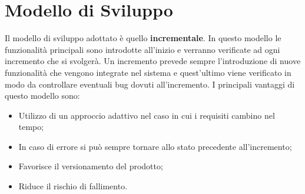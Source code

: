 \section{Modello di Sviluppo}
Il modello di sviluppo adottato è quello \textbf{incrementale}. In questo
modello le funzionalità principali sono introdotte all'inizio e verranno verificate 
ad ogni incremento che si svolgerà. Un incremento prevede sempre l'introduzione di nuove
funzionalità che vengono integrate nel sistema e quest'ultimo viene verificato in modo da
controllare eventuali bug dovuti all'incremento. I principali vantaggi di questo modello sono:
\begin{itemize}
    \item Utilizzo di un approccio adattivo nel caso in cui i requisiti cambino nel tempo;
    \item In caso di errore si può sempre tornare allo stato precedente all'incremento;
    \item Favorisce il versionamento del prodotto;
    \item Riduce il rischio di fallimento.
\end{itemize}